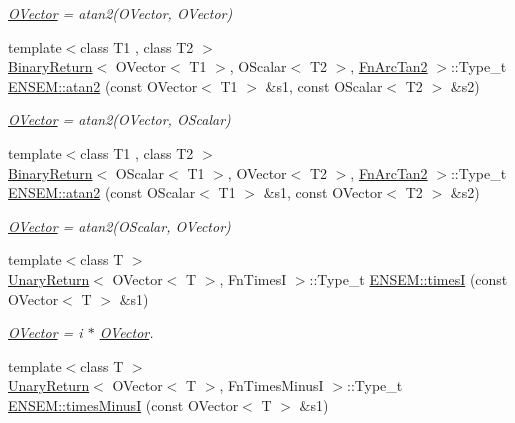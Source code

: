 \begin{DoxyCompactItemize}
\begin{DoxyCompactList}\small\item\em \mbox{\hyperlink{classENSEM_1_1OVector}{O\+Vector}} = atan2(\+O\+Vector, O\+Vector) \end{DoxyCompactList}\item 
{\footnotesize template$<$class T1 , class T2 $>$ }\\\mbox{\hyperlink{structBinaryReturn}{Binary\+Return}}$<$ O\+Vector$<$ T1 $>$, O\+Scalar$<$ T2 $>$, \mbox{\hyperlink{structFnArcTan2}{Fn\+Arc\+Tan2}} $>$\+::Type\+\_\+t \mbox{\hyperlink{group__obsvector_ga6f583b255bc8225ce768b9b916c9e271}{E\+N\+S\+E\+M\+::atan2}} (const O\+Vector$<$ T1 $>$ \&s1, const O\+Scalar$<$ T2 $>$ \&s2)
\begin{DoxyCompactList}\small\item\em \mbox{\hyperlink{classENSEM_1_1OVector}{O\+Vector}} = atan2(\+O\+Vector, O\+Scalar) \end{DoxyCompactList}\item 
{\footnotesize template$<$class T1 , class T2 $>$ }\\\mbox{\hyperlink{structBinaryReturn}{Binary\+Return}}$<$ O\+Scalar$<$ T1 $>$, O\+Vector$<$ T2 $>$, \mbox{\hyperlink{structFnArcTan2}{Fn\+Arc\+Tan2}} $>$\+::Type\+\_\+t \mbox{\hyperlink{group__obsvector_gaf9e56538a48f9abad6df1dda8297795b}{E\+N\+S\+E\+M\+::atan2}} (const O\+Scalar$<$ T1 $>$ \&s1, const O\+Vector$<$ T2 $>$ \&s2)
\begin{DoxyCompactList}\small\item\em \mbox{\hyperlink{classENSEM_1_1OVector}{O\+Vector}} = atan2(\+O\+Scalar, O\+Vector) \end{DoxyCompactList}\item 
{\footnotesize template$<$class T $>$ }\\\mbox{\hyperlink{structUnaryReturn}{Unary\+Return}}$<$ O\+Vector$<$ T $>$, Fn\+TimesI $>$\+::Type\+\_\+t \mbox{\hyperlink{group__obsvector_gae21f93a0579f899ea525fd69333d5381}{E\+N\+S\+E\+M\+::timesI}} (const O\+Vector$<$ T $>$ \&s1)
\begin{DoxyCompactList}\small\item\em \mbox{\hyperlink{classENSEM_1_1OVector}{O\+Vector}} = i $\ast$ \mbox{\hyperlink{classENSEM_1_1OVector}{O\+Vector}}. \end{DoxyCompactList}\item 
{\footnotesize template$<$class T $>$ }\\\mbox{\hyperlink{structUnaryReturn}{Unary\+Return}}$<$ O\+Vector$<$ T $>$, Fn\+Times\+MinusI $>$\+::Type\+\_\+t \mbox{\hyperlink{group__obsvector_ga54c8e8c422afecbe2b647d021d931efb}{E\+N\+S\+E\+M\+::times\+MinusI}} (const O\+Vector$<$ T $>$ \&s1)

\end{DoxyCompactItemize}
